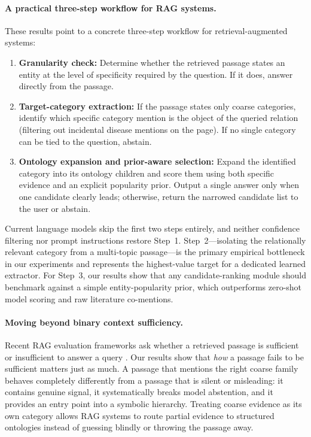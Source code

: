 \paragraph{A practical three-step workflow for RAG systems.}
These results point to a concrete three-step workflow for retrieval-augmented systems:
\begin{enumerate}
\item \textbf{Granularity check:} Determine whether the retrieved passage states an entity at the level of specificity required by the question. If it does, answer directly from the passage.
\item \textbf{Target-category extraction:} If the passage states only coarse categories, identify which specific category mention is the object of the queried relation (filtering out incidental disease mentions on the page). If no single category can be tied to the question, abstain.
\item \textbf{Ontology expansion and prior-aware selection:} Expand the identified category into its ontology children and score them using both specific evidence and an explicit popularity prior. Output a single answer only when one candidate clearly leads; otherwise, return the narrowed candidate list to the user or abstain.
\end{enumerate}
Current language models skip the first two steps entirely, and neither confidence filtering nor prompt instructions restore Step~1. Step~2—isolating the relationally relevant category from a multi-topic passage—is the primary empirical bottleneck in our experiments and represents the highest-value target for a dedicated learned extractor. For Step~3, our results show that any candidate-ranking module should benchmark against a simple entity-popularity prior, which outperforms zero-shot model scoring and raw literature co-mentions.

\paragraph{Moving beyond binary context sufficiency.}
Recent RAG evaluation frameworks ask whether a retrieved passage is sufficient or insufficient to answer a query \citep{joren2025sufficient}. Our results show that \emph{how} a passage fails to be sufficient matters just as much. A passage that mentions the right coarse family behaves completely differently from a passage that is silent or misleading: it contains genuine signal, it systematically breaks model abstention, and it provides an entry point into a symbolic hierarchy. Treating coarse evidence as its own category allows RAG systems to route partial evidence to structured ontologies instead of guessing blindly or throwing the passage away.
